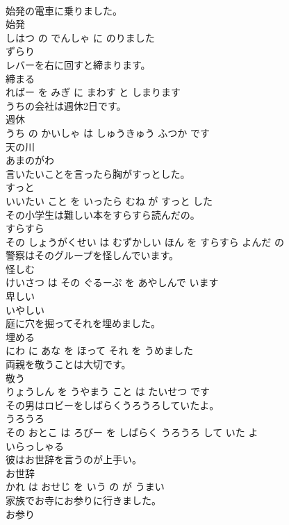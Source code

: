 \documentclass[8pt]{extreport}
\begin{document}
\begin{CJK}{UTF8}{min}
\\	始発の電車に乗りました。	
\\	始発 
\\	しはつ の でんしゃ に のりました			
\\	ずらり	
\\	レバーを右に回すと締まります。	
\\	締まる 
\\	ればー を みぎ に まわす と しまります			
\\	うちの会社は週休2日です。	
\\	週休 
\\	うち の かいしゃ は しゅうきゅう ふつか です			
\\	天の川	
\\	あまのがわ			
\\	言いたいことを言ったら胸がすっとした。	
\\	すっと 
\\	いいたい こと を いったら むね が すっと した			
\\	その小学生は難しい本をすらすら読んだの。	
\\	すらすら 
\\	その しょうがくせい は むずかしい ほん を すらすら よんだ の			
\\	警察はそのグループを怪しんでいます。	
\\	怪しむ 
\\	けいさつ は その ぐるーぷ を あやしんで います			
\\	卑しい	
\\	いやしい			
\\	庭に穴を掘ってそれを埋めました。	
\\	埋める 
\\	にわ に あな を ほって それ を うめました			
\\	両親を敬うことは大切です。	
\\	敬う 
\\	りょうしん を うやまう こと は たいせつ です			
\\	その男はロビーをしばらくうろうろしていたよ。	
\\	うろうろ 
\\	その おとこ は ろびー を しばらく うろうろ して いた よ			
\\	いらっしゃる	
\\	彼はお世辞を言うのが上手い。	
\\	お世辞 
\\	かれ は おせじ を いう の が うまい			
\\	家族でお寺にお参りに行きました。	
\\	お参り 

\end{CJK}
\end{document}
